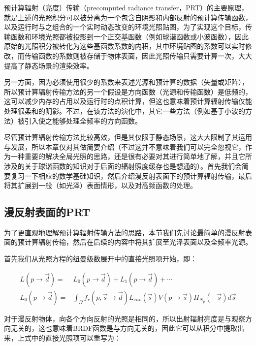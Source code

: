 预计算辐射（亮度）传输（precomputed radiance transfer，PRT）\cite{a:PrecomputedRadianceTransferforRealTimeRenderinginDynamicLowFrequencyLightingEnvironments}的主要原理，就是上述的光照积分可以被分离为一个包含自阴影和内部反射的预计算传输函数，以及运行时与之组合的一个实时动态改变的环境光照贴图，为了实现这个目标，传输函数和环境光照都被投影到一个正交基函数（例如球谐函数或小波函数），因此原始的光照积分被转化为这些基函数系数的内积，其中环境贴图的系数可以实时修改，而传输函数的系数则被存储于物体表面，因此光照传输只需要计算一次，大大提高了静态场景的渲染效率。

另一方面，因为必须使用很少的系数来表述光源和预计算的数据（矢量或矩阵），所以预计算辐射传输方法的另一个假设是方向函数（光源和传输函数）是低频的，这可以减少内存的占用以及运行时的点积计算，但这也意味着预计算辐射传输仅能处理很柔和的阴影。不过，在该方法的演化中，其它一些方法（例如基于小波的方法）被引入使之能够处理全频率的方向函数。

尽管预计算辐射传输方法比较高效，但是其仅限于静态场景，这大大限制了其运用与发展，所以本章仅对其做简要介绍（不过这并不意味着我们可以完全忽视它，作为一种重要的解决全局光照的思路，还是很有必要对其进行简单地了解，并且它所涉及的关于球谐函数的知识对于后面的辐射照度缓存也是想通的）。首先我们会简要复习一下相应的数学基础知识，然后介绍漫反射表面下的预计算辐射传输，最后将其扩展到一般（如光泽）表面情形，以及对高频函数的处理。



\subsection{漫反射表面的PRT}
为了更直观地理解预计算辐射传输方法的思路，本节我们先讨论最简单的漫反射表面的预计算辐射传输，然后在后续的内容中将其扩展至光泽表面以及全频率光源。

首先我们从光照方程的纽曼级数展开中的直接光照项开始，即：

\begin{equation}
\begin{aligned}
	L(p\to\vec{d})=&L_0(p\to\vec{d})+L_1(p\to\vec{d})+\cdots \\
	L_0(p\to\vec{d})=&\int_\Omega f_r(p,\vec{s}\to\vec{d})L_{env}(\vec{s})V(p\to\vec{s})H_{N_p}(-\vec{s})d\vec{s}
\end{aligned}
\end{equation}

对于漫反射物体，向各个方向反射的光照是相同的，所以出射辐射亮度是与观察方向无关的，这也意味着BRDF函数是与方向无关的，因此它可以从积分中提取出来，上式中的直接光照项可以重写为：

